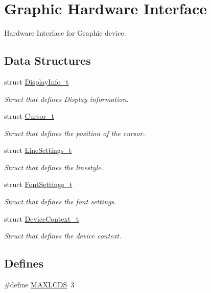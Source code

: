 \hypertarget{group__graphic__hw__interface}{
\section{Graphic Hardware Interface}
\label{group__graphic__hw__interface}
}
Hardware Interface for Graphic device.  


\subsection*{Data Structures}
\begin{CompactItemize}
\item 
struct \hyperlink{struct_display_info__t}{DisplayInfo\_\-t}
\begin{CompactList}\small\item\em Struct that defines Display information. \item\end{CompactList}\item 
struct \hyperlink{struct_cursor__t}{Cursor\_\-t}
\begin{CompactList}\small\item\em Struct that defines the position of the cursor. \item\end{CompactList}\item 
struct \hyperlink{struct_line_settings__t}{LineSettings\_\-t}
\begin{CompactList}\small\item\em Struct that defines the linestyle. \item\end{CompactList}\item 
struct \hyperlink{struct_font_settings__t}{FontSettings\_\-t}
\begin{CompactList}\small\item\em Struct that defines the font settings. \item\end{CompactList}\item 
struct \hyperlink{struct_device_context__t}{DeviceContext\_\-t}
\begin{CompactList}\small\item\em Struct that defines the device context. \item\end{CompactList}\end{CompactItemize}
\subsection*{Defines}
\begin{CompactItemize}
\item 
\#define \hyperlink{group__graphic__hw__interface_g04bac763718080bfe54d5a7fa58036d2}{MAXLCDS}~3
\end{CompactItemize}

